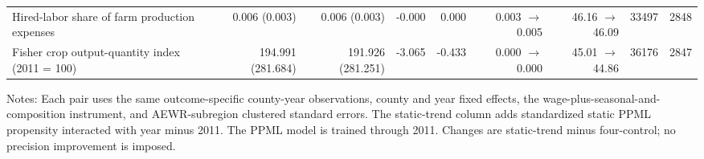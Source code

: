 \begin{table}[htbp]
{\begin{tabular}{lrrrrrrrr}
Hired-labor share of farm production expenses & 0.006 (0.003) & 0.006 (0.003) & -0.000 & 0.000 & 0.003 $\rightarrow$ 0.005 & 46.16 $\rightarrow$ 46.09 & 33497 & 2848 \\
Fisher crop output-quantity index (2011 = 100) & 194.991 (281.684) & 191.926 (281.251) & -3.065 & -0.433 & 0.000 $\rightarrow$ 0.000 & 45.01 $\rightarrow$ 44.86 & 36176 & 2847 \\
\hline\hline
\end{tabular}%
}
\begin{minipage}{0.98\textwidth}\footnotesize Notes: Each pair uses the same outcome-specific county-year observations, county and year fixed effects, the wage-plus-seasonal-and-composition instrument, and AEWR-subregion clustered standard errors. The static-trend column adds standardized static PPML propensity interacted with year minus 2011. The PPML model is trained through 2011. Changes are static-trend minus four-control; no precision improvement is imposed.\end{minipage}
\end{table}
